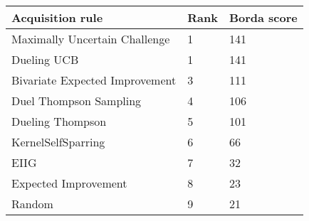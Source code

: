 \begin{tabular}{lll}
Acquisition rule & Rank & Borda score \\ 
\hline 
Maximally Uncertain Challenge                      & 1 & 141 \\ 
Dueling UCB \citep{Benavoli2020}                   & 1 & 141 \\ 
Bivariate Expected Improvement \citep{Nielsen2015} & 3 & 111 \\ 
Duel Thompson Sampling \citep{Gonzalez2017}        & 4 & 106 \\ 
Dueling Thompson \citep{Benavoli2020}              & 5 & 101 \\ 
KernelSelfSparring \citep{Sui2017}                 & 6 & 66 \\ 
EIIG \citep{Benavoli2020}                          & 7 & 32 \\ 
Expected Improvement \citep{Brochu2010a}           & 8 & 23 \\ 
Random                                             & 9 & 21 \\ 
\hline 
\end{tabular}